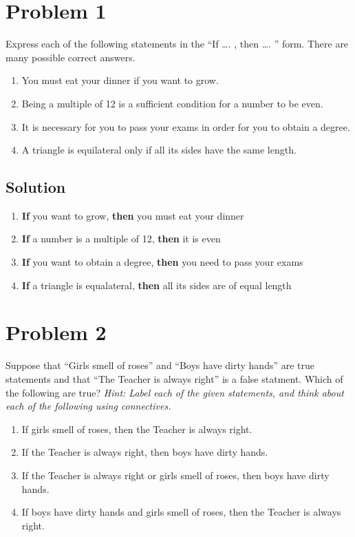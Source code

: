 \documentclass[12pt]{extarticle}
\begin{document}
\section*{Problem 1}

Express each of the following statements in the “If \ldots . , then \ldots . ” form. There are many possible correct answers. 
\begin{enumerate}[label=(\alph*)]
	\item You must eat your dinner if you want to grow. 
	\item Being a multiple of 12 is a sufficient condition for a number to be even. 
	\item It is necessary for you to pass your exams in order for you to obtain a degree. 
	\item A triangle is equilateral only if all its sides have the same length.
\end{enumerate}

\subsection*{Solution}

\begin{enumerate}[label=(\alph*)]
	\item \textbf{If} you want to grow, \textbf{then} you must eat your dinner
	\item \textbf{If} a number is a multiple of 12, \textbf{then} it is even
	\item \textbf{If} you want to obtain a degree, \textbf{then} you need to pass your exams
	\item \textbf{If} a triangle is equalateral, \textbf{then} all its sides are of equal length
\end{enumerate}

\section*{Problem 2}

Suppose that “Girls smell of roses” and “Boys have dirty hands” are true statements and that “The Teacher is always right” is a false statment. Which of the following are true? \textit{Hint: Label each of the given statements, and think about each of the following using connectives.} 

\begin{enumerate}[label=(\alph*)]
	\item If girls smell of roses, then the Teacher is always right. 
	\item If the Teacher is always right, then boys have dirty hands. 
	\item If the Teacher is always right or girls smell of roses, then boys have dirty hands.
	\item If boys have dirty hands and girls smell of roses, then the Teacher is always right.
\end{enumerate}
\end{document}
